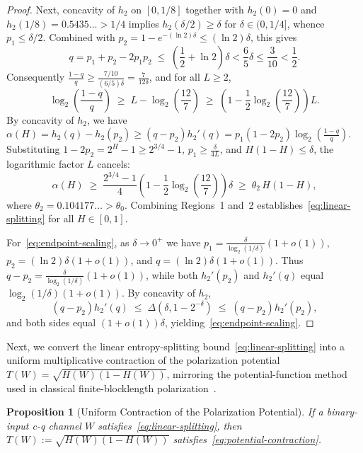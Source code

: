 \documentclass[10pt,a4paper]{article}
\numberwithin{equation}{section}
\theoremstyle{plain}
\newtheorem{proposition}[theorem]{Proposition}
\theoremstyle{definition}
\theoremstyle{remark}
\begin{document}
\begin{proof}
Next, concavity of $h_2$ on $[0, 1/8]$ together with $h_2(0) = 0$ and $h_2(1/8) = 0.5435\ldots > 1/4$ implies $h_2(\delta/2) \ge \delta$ for $\delta \in (0, 1/4]$, whence $p_1 \le \delta/2$. Combined with $p_2 = 1 - e^{-(\ln 2)\delta} \le (\ln 2)\delta$, this gives
\[
q = p_1 + p_2 - 2p_1 p_2 \;\le\; \left(\frac{1}{2} + \ln 2\right)\delta < \frac{6}{5}\delta \le \frac{3}{10} < \frac{1}{2}.
\]
Consequently $\frac{1-q}{q} \ge \frac{7/10}{(6/5)\delta} = \frac{7}{12\delta}$, and for all $L \ge 2$,
\[
\log_2\!\left(\frac{1-q}{q}\right) \;\ge\; L - \log_2\!\left(\frac{12}{7}\right) \;\ge\; \left(1 - \frac{1}{2}\log_2\!\left(\frac{12}{7}\right)\right) L.
\]
By concavity of $h_2$, we have $\alpha(H) = h_2(q) - h_2(p_2) \ge (q - p_2) h_2'(q) = p_1(1 - 2p_2)\log_2(\frac{1-q}{q})$. Substituting $1 - 2p_2 = 2^H - 1 \ge 2^{3/4} - 1$, $p_1 \ge \frac{\delta}{4L}$, and $H(1 - H) \le \delta$, the logarithmic factor $L$ cancels:
\[
\alpha(H) \;\ge\; \frac{2^{3/4} - 1}{4}\left(1 - \frac{1}{2}\log_2\!\left(\frac{12}{7}\right)\right)\delta \;\ge\; \theta_2\, H(1 - H),
\]
where $\theta_2 = 0.104177\ldots > \theta_0$. Combining Regions~1 and~2 establishes~\eqref{eq:linear-splitting} for all $H \in [0,1]$.

For~\eqref{eq:endpoint-scaling}, as $\delta \to 0^+$ we have $p_1 = \frac{\delta}{\log_2(1/\delta)}(1 + o(1))$, $p_2 = (\ln 2)\delta(1 + o(1))$, and $q = (\ln 2)\delta(1 + o(1))$. Thus $q - p_2 = \frac{\delta}{\log_2(1/\delta)}(1 + o(1))$, while both $h_2'(p_2)$ and $h_2'(q)$ equal $\log_2(1/\delta)(1 + o(1))$. By concavity of $h_2$,
\[
(q - p_2) h_2'(q) \;\le\; \Delta(\delta, 1 - 2^{-\delta}) \;\le\; (q - p_2) h_2'(p_2),
\]
and both sides equal $(1 + o(1))\delta$, yielding~\eqref{eq:endpoint-scaling}.
\end{proof}

Next, we convert the linear entropy-splitting bound~\eqref{eq:linear-splitting} into a uniform multiplicative contraction of the polarization potential $T(W) = \sqrt{H(W)(1 - H(W))}$, mirroring the potential-function method used in classical finite-blocklength polarization~\cite{HassaniAlishahiUrbanke2014,GuruswamiXia2015}.

\begin{proposition}[Uniform Contraction of the Polarization Potential]\label{prop:potential-contraction}
If a binary-input c-q channel $W$ satisfies~\eqref{eq:linear-splitting}, then $T(W) := \sqrt{H(W)(1 - H(W))}$ satisfies~\eqref{eq:potential-contraction}.
\end{proposition}
\end{document}
